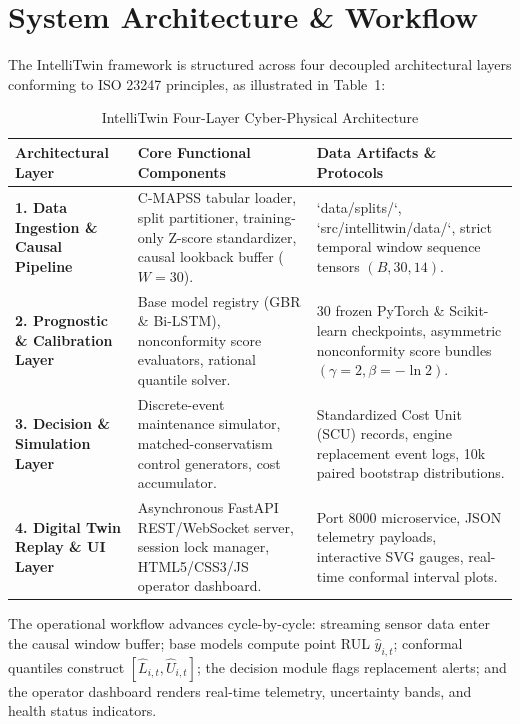 \documentclass[12pt,a4paper]{article}
\begin{document}
\section{System Architecture \& Workflow}
The IntelliTwin framework is structured across four decoupled architectural layers conforming to ISO 23247 principles, as illustrated in Table~1:

\begin{table}[htbp]
\centering
\small
{}
\caption{IntelliTwin Four-Layer Cyber-Physical Architecture}
\label{tab:architecture}
\vspace{4pt}
\begin{tabularx}{\textwidth}{p{2.8cm} p{5.2cm} p{6.2cm}}
\toprule
\textbf{Architectural Layer} & \textbf{Core Functional Components} & \textbf{Data Artifacts \& Protocols} \\
\midrule
\textbf{1. Data Ingestion \& Causal Pipeline} & C-MAPSS tabular loader, split partitioner, training-only Z-score standardizer, causal lookback buffer ($W=30$). & `data/splits/`, `src/intellitwin/data/`, strict temporal window sequence tensors $(B, 30, 14)$. \\
\textbf{2. Prognostic \& Calibration Layer} & Base model registry (GBR \& Bi-LSTM), nonconformity score evaluators, rational quantile solver. & 30 frozen PyTorch \& Scikit-learn checkpoints, asymmetric nonconformity score bundles $(\gamma=2, \beta=-\ln 2)$. \\
\textbf{3. Decision \& Simulation Layer} & Discrete-event maintenance simulator, matched-conservatism control generators, cost accumulator. & Standardized Cost Unit (SCU) records, engine replacement event logs, 10k paired bootstrap distributions. \\
\textbf{4. Digital Twin Replay \& UI Layer} & Asynchronous FastAPI REST/WebSocket server, session lock manager, HTML5/CSS3/JS operator dashboard. & Port 8000 microservice, JSON telemetry payloads, interactive SVG gauges, real-time conformal interval plots. \\
\bottomrule
\end{tabularx}
\end{table}

The operational workflow advances cycle-by-cycle: streaming sensor data enter the causal window buffer; base models compute point RUL $\hat{y}_{i,t}$; conformal quantiles construct $[\hat{L}_{i,t}, \hat{U}_{i,t}]$; the decision module flags replacement alerts; and the operator dashboard renders real-time telemetry, uncertainty bands, and health status indicators.
\end{document}
